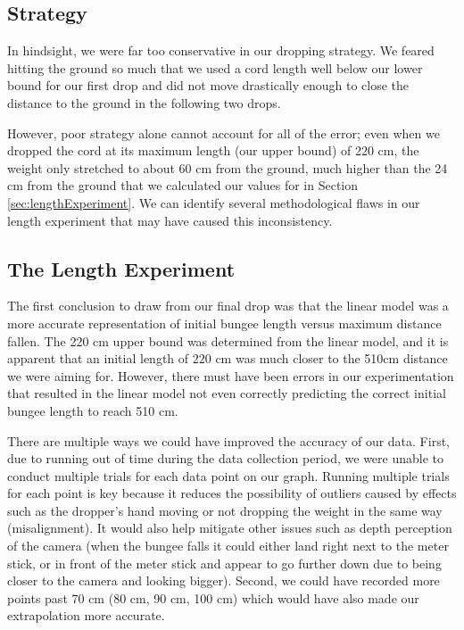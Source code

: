\documentclass[12pt]{article}
\begin{document}
\subsection{Strategy}
In hindsight, we were far too conservative in our dropping strategy. We feared hitting the ground so much that we used a cord length well below our lower bound for our first drop and did not move drastically enough to close the distance to the ground in the following two drops. 
\newline

However, poor strategy alone cannot account for all of the error; even when we dropped the cord at its maximum length (our upper bound) of 220 cm, the weight only stretched to about 60 cm from the ground, much higher than the 24 cm from the ground that we calculated our values for in Section \ref{sec:lengthExperiment}. We can identify several methodological flaws in our length experiment that may have caused this inconsistency.

\subsection{The Length Experiment}

The first conclusion to draw from our final drop was that the linear model was a more accurate representation of initial bungee length versus maximum distance fallen. The 220 cm upper bound was determined from the linear model, and it is apparent that an initial length of 220 cm was much closer to the 510cm distance we were aiming for. However, there must have been errors in our experimentation that resulted in the linear model not even correctly predicting the correct initial bungee length to reach 510 cm.
\newline

There are multiple ways we could have improved the accuracy of our data. First, due to running out of time during the data collection period, we were unable to conduct multiple trials for each data point on our graph. Running multiple trials for each point is key because it reduces the possibility of outliers caused by effects such as the dropper’s hand moving or not dropping the weight in the same way (misalignment). It would also help mitigate other issues such as depth perception of the camera (when the bungee falls it could either land right next to the meter stick, or in front of the meter stick and appear to go further down due to being closer to the camera and looking bigger). Second, we could have recorded more points past 70 cm (80 cm, 90 cm, 100 cm) which would have also made our extrapolation more accurate. 
\newline
\end{document}
